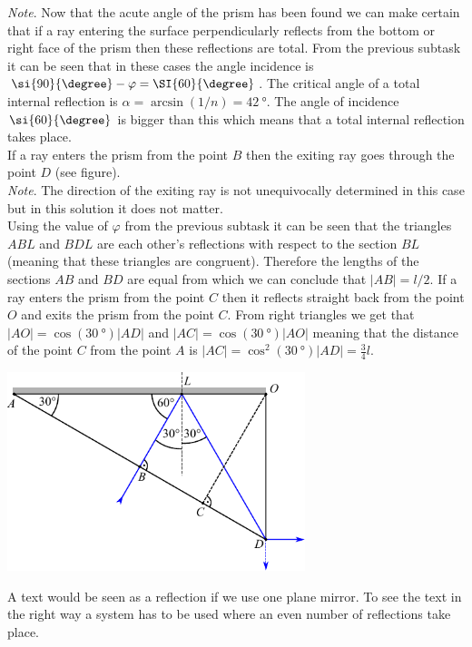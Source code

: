 \documentclass[11pt]{article}
\begin{document}
{\begin{center}
\end{center}
\emph{Note}. Now that the acute angle of the prism has been found we can make certain that if a ray entering the surface perpendicularly reflects from the bottom or right face of the prism then these reflections are total. From the previous subtask it can be seen that in these cases the angle incidence is $\si{90}{\degree}-\varphi=\SI{60}{\degree}$. The critical angle of a total internal reflection is $\alpha=\arcsin(1/n)=\SI{42}{\degree}$. The angle of incidence $\si{60}{\degree}$ is bigger than this which means that a total internal reflection takes place.\\
\osa If a ray enters the prism from the point $B$ then the exiting ray goes through the point $D$ (see figure). \\
\emph{Note}. The direction of the exiting ray is not unequivocally determined in this case but in this solution it does not matter.\\
Using the value of $\varphi$ from the previous subtask it can be seen that the triangles $ABL$ and $BDL$ are each other’s reflections with respect to the section $BL$ (meaning that these triangles are congruent). Therefore the lengths of the sections $AB$ and $BD$ are equal from which we can conclude that $|AB|=l/2$. If a ray enters the prism from the point $C$ then it reflects straight back from the point $O$ and exits the prism from the point $C$. From right triangles we get that $|AO|=\cos(\SI{30}{\degree})|AD|$ and $|AC|=\cos(\SI{30}{\degree})|AO|$ meaning that the distance of the point $C$ from the point $A$ is $|AC|=\cos^2(\SI{30}{\degree})|AD|=\frac{3}{4}l$. 
\begin{center}
  \includegraphics[width=0.65\textwidth]{2014-v3g-04-periskoopprillid_lahendus_joonis3}
\end{center}
\osa A text would be seen as a reflection if we use one plane mirror. To see the text in the right way a system has to be used where an even number of reflections take place.
\fi
}
\end{document}
